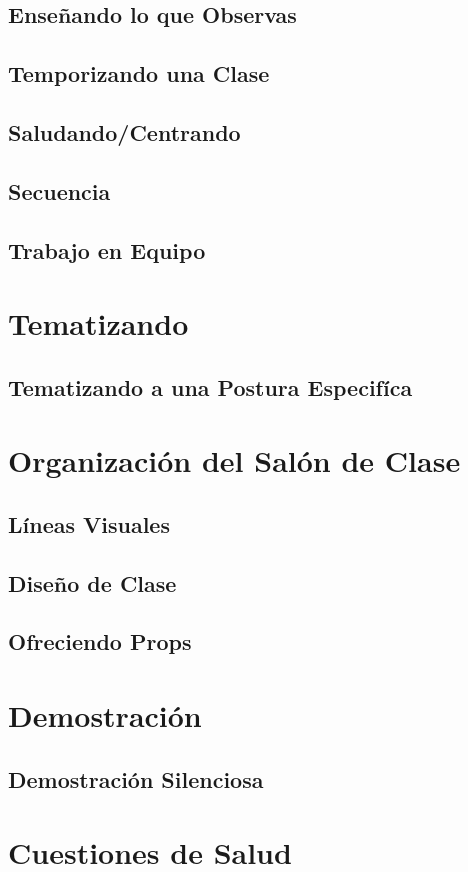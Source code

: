 \subsection{Enseñando lo que Observas}
\subsection{Temporizando una Clase}
\subsection{Saludando/Centrando}
\subsection{Secuencia}
\subsection{Trabajo en Equipo}
\section{Tematizando}
\subsection{Tematizando a una Postura Especifíca}
\section{Organización del Salón de Clase}
\subsection{Líneas Visuales}
\subsection{Diseño de Clase}
\subsection{Ofreciendo Props}
\section{Demostración}
\subsection{Demostración Silenciosa}
\section{Cuestiones de Salud}
